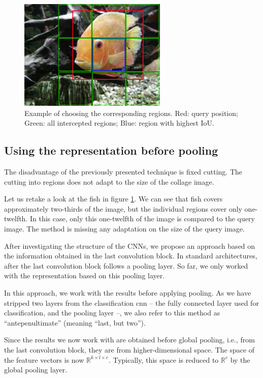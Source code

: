 \begin{figure}
\centering
\includegraphics[width=0.63\textwidth]{img/fish_grid_regions}
\caption[Example of choosing the corresponding regions]{Example of choosing the corresponding regions. Red: query position; Green: all intercepted regions; Blue: region with highest IoU.}
\label{fig:fish_with_grid}
\end{figure}

\subsection{Using the representation before pooling}

The disadvantage of the previously presented technique is fixed cutting. The cutting into regions does not adapt to the size of the collage image. 

Let us retake a look at the fish in figure \ref{fig:fish_with_grid}. We can see that fish covers approximately two-thirds of the image, but the individual regions cover only one-twelfth. In this case, only this one-twelfth of the image is compared to the query image. The method is missing any adaptation on the size of the query image.

After investigating the structure of the CNNs, we propose an approach based on the information obtained in the last convolution block. In standard architectures, after the last convolution block follows a pooling layer. So far, we only worked with the representation based on this pooling layer.

In this approach, we work with the results before applying pooling. As we have stripped two layers from the classification \acrshort{cnn} -- the fully connected layer used for classification, and the pooling layer --, we also refer to this method as ``antepenultimate'' (meaning ``last, but two'').

Since the results we now work with are obtained before global pooling, i.e., from the last convolution block, they are from higher-dimensional space. The space of the feature vectors is now $\mathbb{R}^{k\times l \times c}$. Typically, this space is reduced to $\mathbb{R}^c$ by the global pooling layer.

